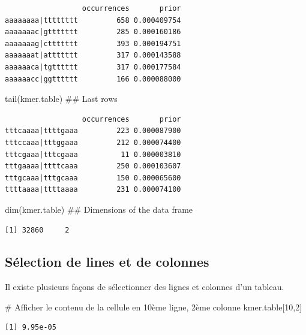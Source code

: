 \documentclass[]{article}
\newenvironment{Shaded}{\begin{snugshade}}{\end{snugshade}}
\newcommand{\KeywordTok}[1]{\textcolor[rgb]{0.94,0.87,0.69}{#1}}
\newcommand{\DecValTok}[1]{\textcolor[rgb]{0.86,0.86,0.80}{#1}}
\newcommand{\CommentTok}[1]{\textcolor[rgb]{0.50,0.62,0.50}{#1}}
\newcommand{\NormalTok}[1]{\textcolor[rgb]{0.80,0.80,0.80}{#1}}
\begin{document}
\begin{verbatim}
                  occurrences       prior
aaaaaaaa|tttttttt         658 0.000409754
aaaaaaac|gttttttt         285 0.000160186
aaaaaaag|cttttttt         393 0.000194751
aaaaaaat|attttttt         317 0.000143588
aaaaaaca|tgtttttt         317 0.000177584
aaaaaacc|ggtttttt         166 0.000088000
\end{verbatim}

\begin{Shaded}
\begin{Highlighting}[]
\KeywordTok{tail}\NormalTok{(kmer.table) ## Last rows}
\end{Highlighting}
\end{Shaded}

\begin{verbatim}
                  occurrences       prior
tttcaaaa|ttttgaaa         223 0.000087900
tttccaaa|tttggaaa         212 0.000074400
tttcgaaa|tttcgaaa          11 0.000003810
tttgaaaa|ttttcaaa         250 0.000103607
tttgcaaa|tttgcaaa         150 0.000065600
ttttaaaa|ttttaaaa         231 0.000074100
\end{verbatim}

\begin{Shaded}
\begin{Highlighting}[]
\KeywordTok{dim}\NormalTok{(kmer.table)   ## Dimensions of the data frame}
\end{Highlighting}
\end{Shaded}

\begin{verbatim}
[1] 32860     2
\end{verbatim}

\subsection{Sélection de lines et de
colonnes}\label{selection-de-lines-et-de-colonnes}

Il existe plusieurs façons de sélectionner des lignes et colonnes d'un
tableau.

\begin{Shaded}
\begin{Highlighting}[]
\CommentTok{# Afficher le contenu de la cellule en 10ème ligne, 2ème colonne}
\NormalTok{kmer.table[}\DecValTok{10}\NormalTok{,}\DecValTok{2}\NormalTok{] }
\end{Highlighting}
\end{Shaded}

\begin{verbatim}
[1] 9.95e-05
\end{verbatim}
\end{document}

